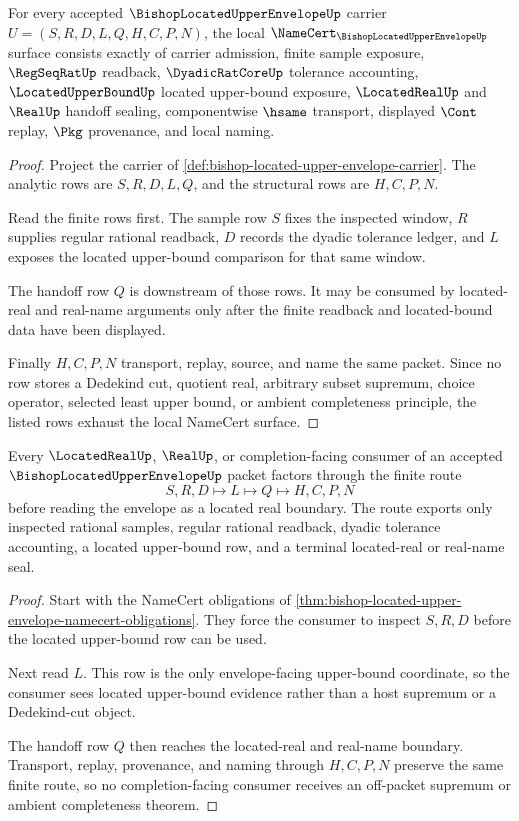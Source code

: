 \begin{theorem}
\label{thm:bishop-located-upper-envelope-namecert-obligations}
For every accepted $\BishopLocatedUpperEnvelopeUp$ carrier $U=(S,R,D,L,Q,H,C,P,N)$, the local $\NameCert_{\BishopLocatedUpperEnvelopeUp}$ surface consists exactly of carrier admission, finite sample exposure, $\RegSeqRatUp$ readback, $\DyadicRatCoreUp$ tolerance accounting, $\LocatedUpperBoundUp$ located upper-bound exposure, $\LocatedRealUp$ and $\RealUp$ handoff sealing, componentwise $\hsame$ transport, displayed $\Cont$ replay, $\Pkg$ provenance, and local naming.
\end{theorem}
\begin{proof}
Project the carrier of \autoref{def:bishop-located-upper-envelope-carrier}. The analytic rows are $S,R,D,L,Q$, and the structural rows are $H,C,P,N$.

Read the finite rows first. The sample row $S$ fixes the inspected window, $R$ supplies regular rational readback, $D$ records the dyadic tolerance ledger, and $L$ exposes the located upper-bound comparison for that same window.

The handoff row $Q$ is downstream of those rows. It may be consumed by located-real and real-name arguments only after the finite readback and located-bound data have been displayed.

Finally $H,C,P,N$ transport, replay, source, and name the same packet. Since no row stores a Dedekind cut, quotient real, arbitrary subset supremum, choice operator, selected least upper bound, or ambient completeness principle, the listed rows exhaust the local NameCert surface.
\end{proof}

\begin{theorem}
\label{thm:bishop-located-upper-envelope-real-located-handoff}
Every $\LocatedRealUp$, $\RealUp$, or completion-facing consumer of an accepted $\BishopLocatedUpperEnvelopeUp$ packet factors through the finite route
$$
S,R,D \longmapsto L \longmapsto Q \longmapsto H,C,P,N
$$
before reading the envelope as a located real boundary. The route exports only inspected rational samples, regular rational readback, dyadic tolerance accounting, a located upper-bound row, and a terminal located-real or real-name seal.
\end{theorem}
\begin{proof}
Start with the NameCert obligations of \autoref{thm:bishop-located-upper-envelope-namecert-obligations}. They force the consumer to inspect $S,R,D$ before the located upper-bound row can be used.

Next read $L$. This row is the only envelope-facing upper-bound coordinate, so the consumer sees located upper-bound evidence rather than a host supremum or a Dedekind-cut object.

The handoff row $Q$ then reaches the located-real and real-name boundary. Transport, replay, provenance, and naming through $H,C,P,N$ preserve the same finite route, so no completion-facing consumer receives an off-packet supremum or ambient completeness theorem.
\end{proof}

